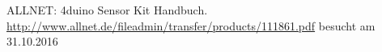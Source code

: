 \begin{thebibliography}{999}
	 ALLNET: 4duino Sensor Kit Handbuch.\\
	\url{http://www.allnet.de/fileadmin/transfer/products/111861.pdf} besucht am	31.10.2016
\end{thebibliography}